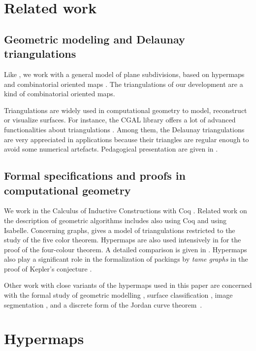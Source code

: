 \documentclass{llncs}
\begin{document}
\section{Related work} 
\label{RW}
 
\subsection{Geometric modeling and Delaunay triangulations}
Like
\cite{gs85}, we work with a general model of plane subdivisions, based
on hypermaps 
\cite{cor} and combinatorial oriented maps \cite{tut2}.  The triangulations
of our development are a kind of combinatorial oriented maps.

Triangulations are widely used in computational geometry to model,
reconstruct or visualize surfaces. For instance, the CGAL library
offers a lot of advanced functionalities about triangulations
\cite{boi:yvi02}. Among them, the Delaunay triangulations
\cite{gs85,knu,ede00,deb08} are very
appreciated in applications because their triangles are regular enough
to avoid some numerical artefacts.  Pedagogical presentation are
given in \cite{ede00,deb08}.

\subsection{Formal specifications and proofs in computational geometry}

We work in the Calculus of
Inductive Constructions with Coq \cite{ber:cas,Coq}.
Related work on the description of geometric algorithms includes
\cite{pic:ber} also using Coq and \cite{mei:fle04} using Isabelle.  Concerning
graphs, \cite{bau:nip} gives a model of triangulations restricted to the
study of the five color theorem.  Hypermaps are also used intensively in
\cite{gon08} for the proof of the four-colour theorem.  A detailed comparison
is given in \cite{duf09}.  Hypermaps also play a significant role in the
formalization of packings by {\em tame graphs} in the proof of Kepler's conjecture \cite{obu:nip}.

Other work with close variants of the hypermaps used in this paper are
concerned with the formal study of geometric modelling \cite{pui:duf1},
surface classification \cite{deh:duf2}, image segmentation \cite{duf07}, and
a discrete form of the Jordan curve theorem~\cite{duf09}.

\section{Hypermaps}
\label{HY}
\end{document}
